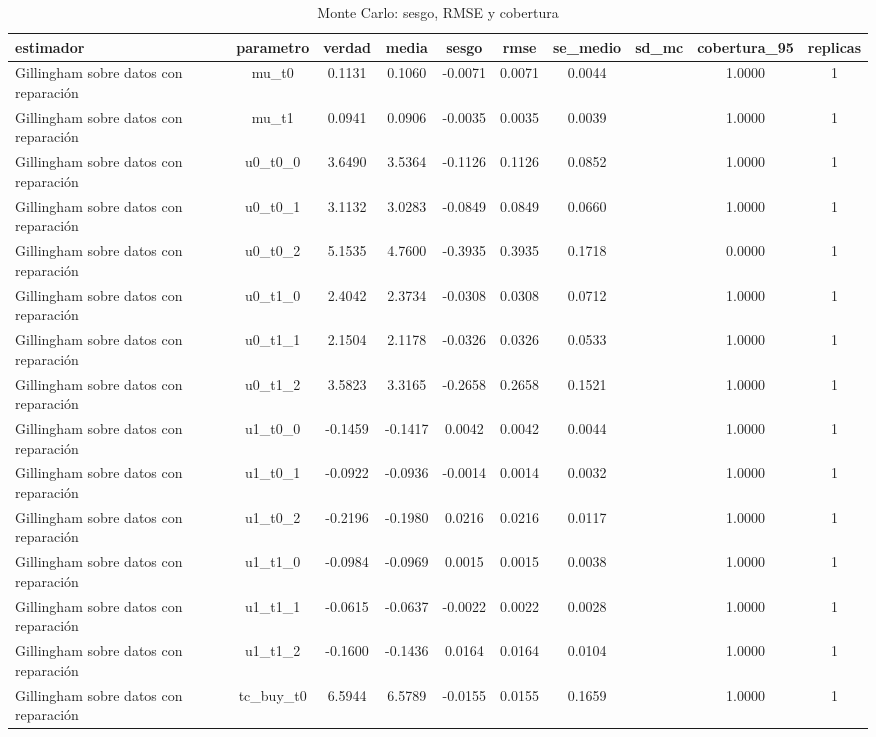 \begin{table}[htbp]
\centering
\caption{Monte Carlo: sesgo, RMSE y cobertura}
\begin{tabular}{lccccccccc}
\toprule
estimador & parametro & verdad & media & sesgo & rmse & se\_medio & sd\_mc & cobertura\_95 & replicas \\
\midrule
Gillingham sobre datos con reparación & mu\_t0 & 0.1131 & 0.1060 & -0.0071 & 0.0071 & 0.0044 &  & 1.0000 & 1 \\
Gillingham sobre datos con reparación & mu\_t1 & 0.0941 & 0.0906 & -0.0035 & 0.0035 & 0.0039 &  & 1.0000 & 1 \\
Gillingham sobre datos con reparación & u0\_t0\_0 & 3.6490 & 3.5364 & -0.1126 & 0.1126 & 0.0852 &  & 1.0000 & 1 \\
Gillingham sobre datos con reparación & u0\_t0\_1 & 3.1132 & 3.0283 & -0.0849 & 0.0849 & 0.0660 &  & 1.0000 & 1 \\
Gillingham sobre datos con reparación & u0\_t0\_2 & 5.1535 & 4.7600 & -0.3935 & 0.3935 & 0.1718 &  & 0.0000 & 1 \\
Gillingham sobre datos con reparación & u0\_t1\_0 & 2.4042 & 2.3734 & -0.0308 & 0.0308 & 0.0712 &  & 1.0000 & 1 \\
Gillingham sobre datos con reparación & u0\_t1\_1 & 2.1504 & 2.1178 & -0.0326 & 0.0326 & 0.0533 &  & 1.0000 & 1 \\
Gillingham sobre datos con reparación & u0\_t1\_2 & 3.5823 & 3.3165 & -0.2658 & 0.2658 & 0.1521 &  & 1.0000 & 1 \\
Gillingham sobre datos con reparación & u1\_t0\_0 & -0.1459 & -0.1417 & 0.0042 & 0.0042 & 0.0044 &  & 1.0000 & 1 \\
Gillingham sobre datos con reparación & u1\_t0\_1 & -0.0922 & -0.0936 & -0.0014 & 0.0014 & 0.0032 &  & 1.0000 & 1 \\
Gillingham sobre datos con reparación & u1\_t0\_2 & -0.2196 & -0.1980 & 0.0216 & 0.0216 & 0.0117 &  & 1.0000 & 1 \\
Gillingham sobre datos con reparación & u1\_t1\_0 & -0.0984 & -0.0969 & 0.0015 & 0.0015 & 0.0038 &  & 1.0000 & 1 \\
Gillingham sobre datos con reparación & u1\_t1\_1 & -0.0615 & -0.0637 & -0.0022 & 0.0022 & 0.0028 &  & 1.0000 & 1 \\
Gillingham sobre datos con reparación & u1\_t1\_2 & -0.1600 & -0.1436 & 0.0164 & 0.0164 & 0.0104 &  & 1.0000 & 1 \\
Gillingham sobre datos con reparación & tc\_buy\_t0 & 6.5944 & 6.5789 & -0.0155 & 0.0155 & 0.1659 &  & 1.0000 & 1 \\

\end{tabular}
\end{table}
